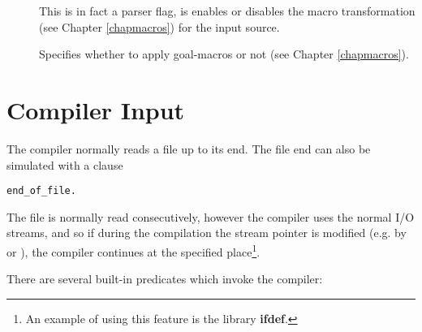 \begin{description}
\item [] 
This is in fact a parser flag, is enables or disables the macro transformation
(see Chapter \ref{chapmacros}) for the input source.

\item [] 
Specifies whether to apply goal-macros or not (see Chapter \ref{chapmacros}).
\end{description}

\section{Compiler Input}
The compiler normally reads a file up to its end.
The file end can also be simulated with a clause
\begin{verbatim}
end_of_file.
\end{verbatim}
The file is normally read consecutively, however
the compiler uses the normal {\eclipse} I/O streams,
and so if during the compilation the stream pointer is modified
(e.g. by  or ), the compiler continues
at the specified place\footnote{An example of using this feature
is the library {\bf ifdef}.}.

There are several built-in predicates which invoke the compiler:

